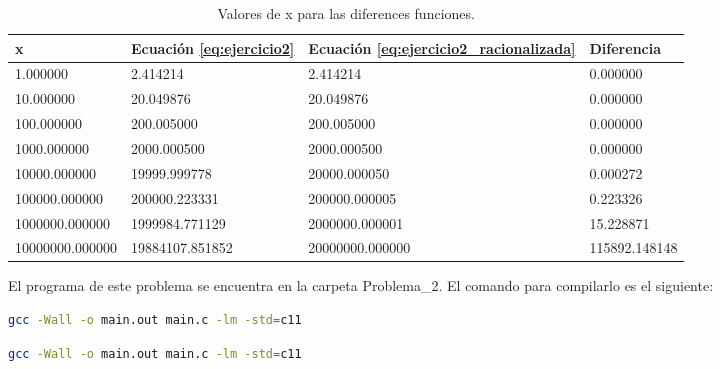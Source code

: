\begin{table}[H]
    \centering
    \begin{tabular}{llll} \hline
        \textbf{x}      & \textbf{Ecuación \ref{eq:ejercicio2}} & \textbf{Ecuación \ref{eq:ejercicio2_racionalizada}} & \textbf{Diferencia} \\ \hline
        1.000000        & 2.414214                              & 2.414214                                            & 0.000000            \\
        10.000000       & 20.049876                             & 20.049876                                           & 0.000000            \\
        100.000000      & 200.005000                            & 200.005000                                          & 0.000000            \\
        1000.000000     & 2000.000500                           & 2000.000500                                         & 0.000000            \\
        10000.000000    & 19999.999778                          & 20000.000050                                        & 0.000272            \\
        100000.000000   & 200000.223331                         & 200000.000005                                       & 0.223326            \\
        1000000.000000  & 1999984.771129                        & 2000000.000001                                      & 15.228871           \\
        10000000.000000 & 19884107.851852                       & 20000000.000000                                     & 115892.148148       \\ \hline
    \end{tabular}
    \caption{Valores de x para las diferences funciones.}
    \label{table:problema2}
\end{table}

El programa de este problema se encuentra en la carpeta \textcolor{citecolor}{Problema\_2}. El comando para compilarlo es el siguiente:

\begin{lstlisting}[language=bash]
    gcc -Wall -o main.out main.c -lm -std=c11
\end{lstlisting}

\begin{lstlisting}[language=bash]
    gcc -Wall -o main.out main.c -lm -std=c11
\end{lstlisting}

